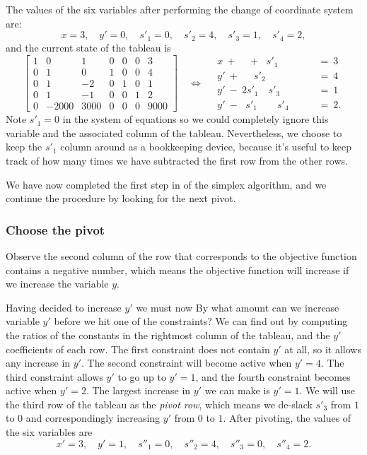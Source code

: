 \documentclass[11pt,oneside]{article}
\begin{document}
		The values of the six variables after performing the change of coordinate system are:
		\[
			x=3, \quad y'=0, \quad s'_1=0, \quad s'_2=4,  \quad s'_3=1, \quad s'_4=2,
		\]		
		and the current state of the tableau is 
		\vspace{1mm}
		{\footnotesize
		\[		
			\left[
			\begin{array}{rrrrrr|r}
				1&     0&    1& 0& 0& 0&    3      \\ 
				0&     1&    0& 1& 0& 0&    4      \\ 
				0&     1&   -2& 0& 1& 0&    1      \\ 
				0&     1&   -1& 0& 0& 1&    2      \\ 
				0& -2000& 3000& 0& 0& 0& 9000      
			\end{array}
			\right]			
			\quad
			\Leftrightarrow
			\quad		
			\begin{array}{rl}
				x \ + \ \ \ \ \ + \, \ \  s'_1 \quad \quad \quad	\ &=	\ 3	\\
				          y' \ + \quad \ \  s'_2 \quad \quad 		\ &= 	\ 4	\\
				 y' \ - \ 2s'_1 \quad  s'_3 \quad 		\ &= 	\ 1	\\
				 y' \ - \, \ \ s'_1 \quad \quad  s'_4   		\ &= 	\ 2.
			\end{array} 				
		\]}%
		Note $s'_1=0$ in the system of equations so we could completely ignore this variable and the associated column of the tableau.
		Nevertheless,  we choose to keep the $s'_1$ column around as a bookkeeping device,
		because it's useful to keep track of how many times we have subtracted the first row from the other rows.

		We have now completed the first step in of the simplex algorithm,
		and we continue the procedure by looking for the next pivot.
		
		
	\subsubsection{Choose the pivot}
	
		Observe the second column of the row that corresponds to the objective function contains a negative number,
		which means the objective function will increase if we increase the variable $y$.

		
		Having decided to increase $y'$ we must now 
		By what amount can we increase variable $y'$ before we hit one of the constraints?
		We can find out by computing the ratios of the constants in the rightmost column of the tableau,
		and the $y'$ coefficients of each row.
		The first constraint does not contain $y'$ at all, so it allows any increase in $y'$.
		The second constraint will become active when $y' = 4$.
		The third constraint allows $y'$ to go up to $y'=1$,
		and the fourth constraint becomes active when $y'=2$.
		The largest increase in $y'$ we can make is $y'=1$.
		We will use the third row of the tableau as the \emph{pivot row},
		which means we de-slack $s'_3$ from $1$ to $0$ and correspondingly increasing $y'$ from $0$ to $1$.
		After pivoting, the values of the six variables are
		\[
			x'=3, \quad y'=1, \quad s''_1=0, \quad s''_2=4,  \quad s''_3=0, \quad s''_4=2.
		\]
		
\end{document}
